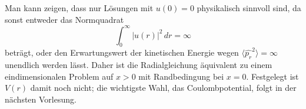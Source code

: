 Man kann zeigen, dass nur Lösungen mit $u(0)=0$ physikalisch sinnvoll sind, da sonst entweder das Normquadrat 
\begin{equation}
	\int_0^\infty |u(r)|^2\, dr = \infty
\end{equation}
beträgt, oder den Erwartungswert der kinetischen Energie wegen $\langle \widehat{p_r}^2\rangle = \infty$ unendlich werden lässt. Daher ist die Radialgleichung äquivalent zu einem eindimensionalen Problem auf $x>0$ mit Randbedingung bei $x=0$. Festgelegt ist $V(r)$ damit noch nicht; die wichtigste Wahl, das Coulombpotential, folgt in der nächsten Vorlesung.

